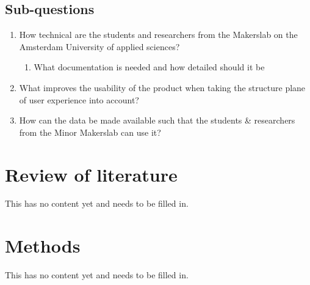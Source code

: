 \documentclass{report}
\begin{document}
\section{Sub-questions}
\begin{enumerate}
\item How technical are the students and researchers from the Makerslab on the Amsterdam University of applied sciences?
\begin{enumerate}
\item What documentation is needed and how detailed should it be
\end{enumerate}
\item What improves the usability of the product when taking the structure plane of user experience into account?
\item How can the data be made available such that the students \& researchers from the Minor Makerslab can use it?
\end{enumerate}

\chapter{Review of literature}
This has no content yet and needs to be filled in. 

\chapter{Methods}
This has no content yet and needs to be filled in. 
\end{document}
